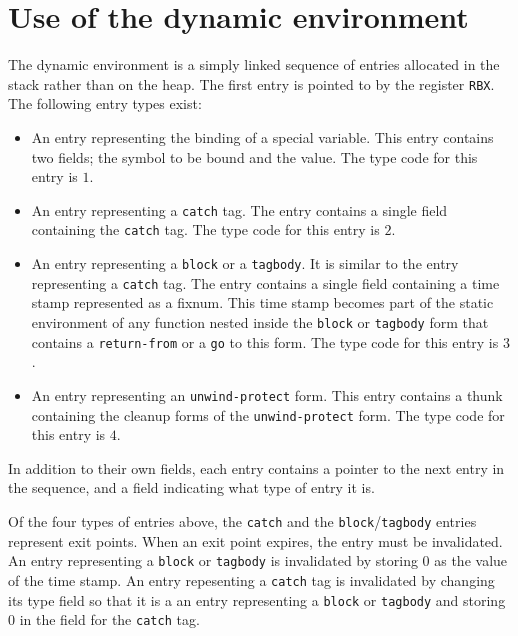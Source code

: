 \section{Use of the dynamic environment}

The dynamic environment is a simply linked sequence of entries
allocated in the stack rather than on the heap.  The first entry is
pointed to by the register \texttt{RBX}.
 The following entry types
exist:

\begin{itemize}
  \item An entry representing the binding of a special variable.  This
    entry contains two fields; the symbol to be bound and the value.
    The type code for this entry is $1$.

  \item An entry representing a \texttt{catch} tag.  The entry
    contains a single field containing the \texttt{catch} tag.
    The type code for this entry is $2$.

  \item An entry representing a \texttt{block} or a \texttt{tagbody}.
    It is similar to the entry representing a \texttt{catch} tag.  The
    entry contains a single field containing a time stamp represented
    as a fixnum.  This time stamp becomes part of the static
    environment of any function nested inside the \texttt{block} or
    \texttt{tagbody} form that contains a \texttt{return-from} or a
    \texttt{go} to this form. The type code for this entry is $3$.

  \item An entry representing an \texttt{unwind-protect} form.  This
    entry contains a thunk containing the cleanup forms of the
    \texttt{unwind-protect} form. The type code for this entry is $4$.
\end{itemize}

In addition to their own fields, each entry contains a pointer to the
next entry in the sequence, and a field indicating what type of entry
it is.

Of the four types of entries above, the \texttt{catch} and the
\texttt{block}/\texttt{tagbody} entries represent exit points.  When
an exit point expires, the entry must be invalidated.  An entry
representing a \texttt{block} or \texttt{tagbody} is invalidated by
storing 0 as the value of the time stamp.  An entry repesenting a
\texttt{catch} tag is invalidated by changing its type field so that
it is a an entry representing a \texttt{block} or \texttt{tagbody} and
storing 0 in the field for the \texttt{catch} tag.

